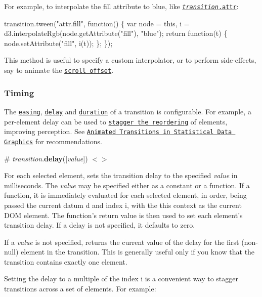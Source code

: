 For example, to interpolate the fill attribute to blue, like \href{#transition_attr}{\tt {\itshape transition}.attr}\+:


\begin{DoxyCode}
transition.tween("attr.fill", function() \{
  var node = this, i = d3.interpolateRgb(node.getAttribute("fill"), "blue");
  return function(t) \{
    node.setAttribute("fill", i(t));
  \};
\});
\end{DoxyCode}


This method is useful to specify a custom interpolator, or to perform side-\/effects, say to animate the \href{http://bl.ocks.org/mbostock/1649463}{\tt scroll offset}.

\subsubsection*{Timing}

The \href{#transition_ease}{\tt easing}, \href{#transition_delay}{\tt delay} and \href{#transition_duration}{\tt duration} of a transition is configurable. For example, a per-\/element delay can be used to \href{http://bl.ocks.org/mbostock/3885705}{\tt stagger the reordering} of elements, improving perception. See \href{http://vis.berkeley.edu/papers/animated_transitions/}{\tt Animated Transitions in Statistical Data Graphics} for recommendations.

\label{_transition_delay}%
\# {\itshape transition}.{\bfseries delay}(\mbox{[}{\itshape value}\mbox{]}) \href{https://github.com/d3/d3-transition/blob/master/src/transition/delay.js}{\tt $<$$>$}

For each selected element, sets the transition delay to the specified {\itshape value} in milliseconds. The {\itshape value} may be specified either as a constant or a function. If a function, it is immediately evaluated for each selected element, in order, being passed the current datum {\ttfamily d} and index {\ttfamily i}, with the {\ttfamily this} context as the current D\+OM element. The function’s return value is then used to set each element’s transition delay. If a delay is not specified, it defaults to zero.

If a {\itshape value} is not specified, returns the current value of the delay for the first (non-\/null) element in the transition. This is generally useful only if you know that the transition contains exactly one element.

Setting the delay to a multiple of the index {\ttfamily i} is a convenient way to stagger transitions across a set of elements. For example\+:


